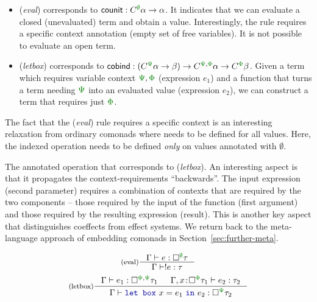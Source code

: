 \begin{itemize}
\item (\emph{eval}) corresponds to $\ident{counit} : \ctyp{\cclrd{\emptyset}}{\alpha} \rightarrow \alpha$.
  It indicates that we can evaluate a closed (unevaluated) term and obtain a value. Interestingly, the
  rule requires a specific context annotation (empty set of free variables).
  It is not possible to evaluate an open term.

\item (\emph{letbox}) corresponds to $\ident{cobind} : (\ctyp{\cclrd{\Psi}}{\alpha} \rightarrow \beta)
  \rightarrow \ctyp{\cclrd{\Psi}, \cclrd{\Phi}}{\alpha} \rightarrow \ctyp{\cclrd{\Phi}}{\beta}$.
  Given a term which requires variable context $\cclrd{\Psi}, \cclrd{\Phi}$
  (expression $e_1$) and a function that turns a term needing $\cclrd{\Psi}$ into an evaluated
  value (expression $e_2$), we can construct a term that requires just $\cclrd{\Phi}$.
\end{itemize}

\noindent
The fact that the (\emph{eval}) rule requires a specific context is an interesting relaxation
from ordinary comonads where  needs to be defined for all values. Here, the indexed
 operation needs to be defined \emph{only} on values annotated with $\emptyset$.

The annotated  operation that corresponds to (\emph{letbox}). An interesting aspect
is that it propagates the context-requirements ``backwards''. The input expression (second parameter)
requires a combination of contexts that are required by the two components -- those required by the
input of the function (first argument) and those required by the resulting expression (result).
This is another key aspect that distinguishes coeffects from effect systems. We return back to
the meta-language approach of embedding comonads in Section~\ref{sec:further-meta}.


\begin{figure}
\begin{equation*}
\inference[(eval)]
  {\Gamma \vdash e : \square^{\cclrd{\emptyset}}{\tau}}
  {\Gamma \vdash !e : \tau}
\end{equation*}
\begin{equation*}
\inference[(letbox)]
  { \Gamma \vdash e_1 : \square^{\cclrd{\Phi}, \cclrd{\Psi}}{\tau_1} &
    \Gamma, x\!:\!\square^{\cclrd{\Phi}}{\tau_1} \vdash e_2 : \tau_2 }
  { \Gamma \vdash \kvd{let~box}~x=e_1~\kvd{in}~e_2 : \square^{\cclrd{\Psi}}{\tau_2}}
\end{equation*}

\label{fig:modal-meta}
\end{figure}

